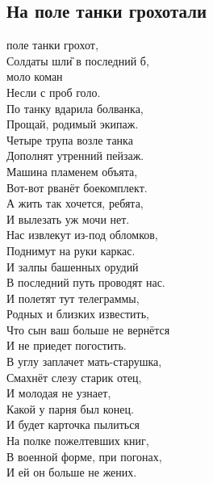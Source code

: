 \documentclass[fleqn,a5paper,12pt,twoside]{guitartabs}
\newcommand{\musVspace}{\vspace{2mm}}
\begin{document}
\subsection*{На поле танки грохотали}
     поле танки грохот,\\ 
    Солдаты шл\G{и} в последний б,\\
     моло коман \\
    Несли с проб голо. \musVspace\\
    \-\hspace{3mm}По танку вдарила болванка, \\
    \-\hspace{3mm}Прощай, родимый экипаж. \\
    \-\hspace{3mm}Четыре трупа возле танка \\
    \-\hspace{3mm}Дополнят утренний пейзаж. \musVspace\\
    Машина пламенем объята, \\
    Вот-вот рванёт боекомплект.\\
    А жить так хочется, ребята,\\
    И вылезать уж мочи нет. \musVspace \\
    \-\hspace{3mm}Нас извлекут из-под обломков, \\
    \-\hspace{3mm}Поднимут на руки каркас.  \\
    \-\hspace{3mm}И залпы башенных орудий \\
    \-\hspace{3mm}В последний путь проводят нас. \musVspace\\
    И полетят тут телеграммы,\\
    Родных и близких известить,\\
    Что сын ваш больше не вернётся\\ 
    И не приедет погостить.\musVspace \\
    \-\hspace{3mm}В углу заплачет мать-старушка, \\
    \-\hspace{3mm}Смахнёт слезу старик отец,  \\
    \-\hspace{3mm}И молодая не узнает, \\
    \-\hspace{3mm}Какой у парня был конец.  \musVspace\\
    И будет карточка пылиться \\
    На полке пожелтевших книг,   \\
    В военной форме, при погонах, \\
    И ей он больше не жених.
\newpage
{}%
\end{document}
